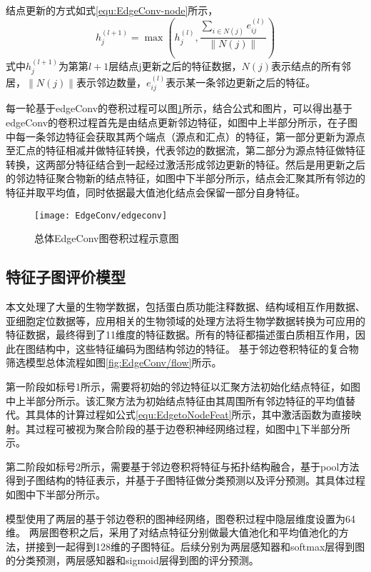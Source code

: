 结点更新的方式如式\ref{equ:EdgeConv-node}所示，
\begin{equation}
    \label{equ:EdgeConv-node}
    h_j^{(l+1)} = \max(h_j^{(l)},\frac{\sum_{i \in N(j)}{e_{ij}^{(l)}}}{\left\lVert N(j)\right\rVert } )
\end{equation}
式中$h_j^{(l+1)}$为第第$l+1$层结点j更新之后的特征数据，$N(j)$表示结点的所有邻居，$\left\lVert N(j)\right\rVert $表示邻边数量，$e_{ij}^{(l)}$表示某一条邻边更新之后的特征。

每一轮基于edgeConv的卷积过程可以图\ref{fig:EdgeConv/edgeconv}所示，结合公式和图片，可以得出基于edgeConv的卷积过程首先是由结点更新邻边特征，如图中上半部分所示，在子图中每一条邻边特征会获取其两个端点（源点和汇点）的特征，第一部分更新为源点至汇点的特征相减并做特征转换，代表邻边的数据流，第二部分为源点特征做特征转换，这两部分特征结合到一起经过激活形成邻边更新的特征。然后是用更新之后的邻边特征聚合物新的结点特征，如图中下半部分所示，结点会汇聚其所有邻边的特征并取平均值，同时依据最大值池化结点会保留一部分自身特征。

\begin{figure}[htbp]
    \centering
    \texttt{[image: EdgeConv/edgeconv]}
    \caption{总体EdgeConv图卷积过程示意图}
    \label{fig:EdgeConv/edgeconv}
\end{figure}

\subsection{特征子图评价模型}

本文处理了大量的生物学数据，包括蛋白质功能注释数据、结构域相互作用数据、亚细胞定位数据等，应用相关的生物领域的处理方法将生物学数据转换为可应用的特征数据，最终得到了11维度的特征数据。所有的特征都描述蛋白质相互作用，因此在图结构中，这些特征编码为图结构邻边的特征。
基于邻边卷积特征的复合物筛选模型总体流程如图\ref{fig:EdgeConv/flow}所示。

第一阶段如标号1所示，需要将初始的邻边特征以汇聚方法初始化结点特征，如图中上半部分所示。该汇聚方法为初始结点特征由其周围所有邻边特征的平均值替代。其具体的计算过程如公式\ref{equ:EdgetoNodeFeat}所示，其中激活函数为直接映射。其过程可被视为聚合阶段的基于边卷积神经网络过程，如图中\ref{fig:EdgeConv/edgeconv}下半部分所示。

第二阶段如标号2所示，需要基于邻边卷积将特征与拓扑结构融合，基于pool方法得到子图结构的特征表示，并基于子图特征做分类预测以及评分预测。其具体过程如图中下半部分所示。

模型使用了两层的基于邻边卷积的图神经网络，图卷积过程中隐层维度设置为64维。
两层图卷积之后，采用了对结点特征分别做最大值池化和平均值池化的方法，拼接到一起得到128维的子图特征。后续分别为两层感知器和softmax层得到图的分类预测，两层感知器和sigmoid层得到图的评分预测。


